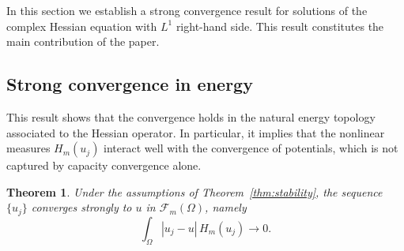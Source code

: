\documentclass[10pt,a4paper]{amsart}
\newtheorem{theorem}{Theorem}[section]
\begin{document}
	In this section we establish a strong convergence result for solutions of the complex Hessian equation with $L^1$ right-hand side.
	This result constitutes the main contribution of the paper.	
	

	
	
	
	
	\subsection{Strong convergence in energy}
	
This result shows that the convergence holds in the natural
energy topology associated to the Hessian operator.
In particular, it implies that the nonlinear measures $H_m(u_j)$
interact well with the convergence of potentials,
which is not captured by capacity convergence alone.
	
	\begin{theorem}\label{thm:strong}
		Under the assumptions of Theorem~\ref{thm:stability}, the sequence $\{u_j\}$ converges strongly to $u$ in $\mathcal{F}_m(\Omega)$, namely
		\[
		\int_\Omega |u_j - u| \, H_m(u_j) \longrightarrow 0.
		\]
	\end{theorem}
	
\end{document}
